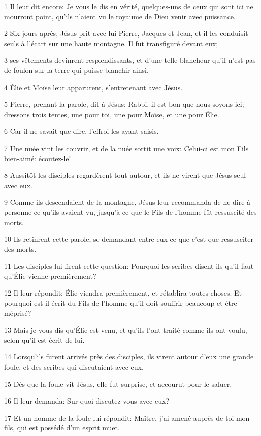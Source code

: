 \par 1 Il leur dit encore: Je vous le dis en vérité, quelques-uns de ceux qui sont ici ne mourront point, qu'ils n'aient vu le royaume de Dieu venir avec puissance.
\par 2 Six jours après, Jésus prit avec lui Pierre, Jacques et Jean, et il les conduisit seuls à l'écart sur une haute montagne. Il fut transfiguré devant eux;
\par 3 ses vêtements devinrent resplendissants, et d'une telle blancheur qu'il n'est pas de foulon sur la terre qui puisse blanchir ainsi.
\par 4 Élie et Moïse leur apparurent, s'entretenant avec Jésus.
\par 5 Pierre, prenant la parole, dit à Jésus: Rabbi, il est bon que nous soyons ici; dressons trois tentes, une pour toi, une pour Moïse, et une pour Élie.
\par 6 Car il ne savait que dire, l'effroi les ayant saisis.
\par 7 Une nuée vint les couvrir, et de la nuée sortit une voix: Celui-ci est mon Fils bien-aimé: écoutez-le!
\par 8 Aussitôt les disciples regardèrent tout autour, et ils ne virent que Jésus seul avec eux.
\par 9 Comme ils descendaient de la montagne, Jésus leur recommanda de ne dire à personne ce qu'ils avaient vu, jusqu'à ce que le Fils de l'homme fût ressuscité des morts.
\par 10 Ils retinrent cette parole, se demandant entre eux ce que c'est que ressusciter des morts.
\par 11 Les disciples lui firent cette question: Pourquoi les scribes disent-ils qu'il faut qu'Élie vienne premièrement?
\par 12 Il leur répondit: Élie viendra premièrement, et rétablira toutes choses. Et pourquoi est-il écrit du Fils de l'homme qu'il doit souffrir beaucoup et être méprisé?
\par 13 Mais je vous dis qu'Élie est venu, et qu'ils l'ont traité comme ils ont voulu, selon qu'il est écrit de lui.
\par 14 Lorsqu'ils furent arrivés près des disciples, ils virent autour d'eux une grande foule, et des scribes qui discutaient avec eux.
\par 15 Dès que la foule vit Jésus, elle fut surprise, et accourut pour le saluer.
\par 16 Il leur demanda: Sur quoi discutez-vous avec eux?
\par 17 Et un homme de la foule lui répondit: Maître, j'ai amené auprès de toi mon fils, qui est possédé d'un esprit muet.

